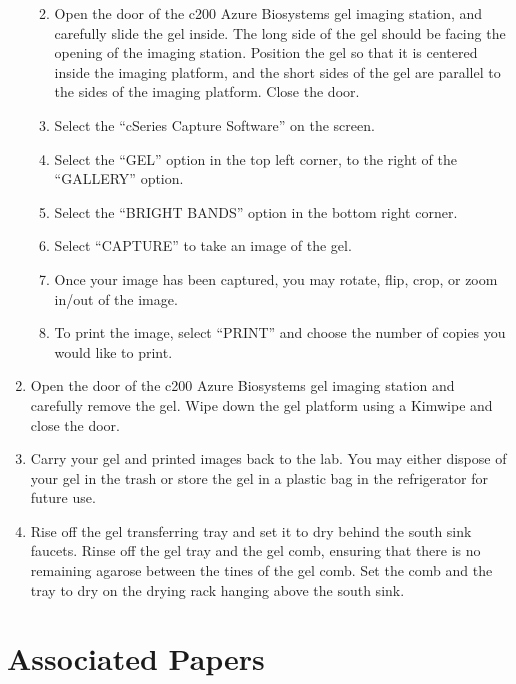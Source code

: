 \documentclass[
  letterpaper,
  DIV=11,
  numbers=noendperiod]{scrreprt}
\providecommand{\tightlist}{%
  \setlength{\itemsep}{0pt}\setlength{\parskip}{0pt}}\usepackage{longtable,booktabs,array}
\begin{document}
\begin{enumerate}
  \begin{enumerate}
  \def\labelenumii{\alph{enumii}.}
  \tightlist
  \item
    Open the door of the c200 Azure Biosystems gel imaging station, and
    carefully slide the gel inside. The long side of the gel should be
    facing the opening of the imaging station. Position the gel so that
    it is centered inside the imaging platform, and the short sides of
    the gel are parallel to the sides of the imaging platform. Close the
    door.
  \item
    Select the ``cSeries Capture Software'' on the screen.
  \item
    Select the ``GEL'' option in the top left corner, to the right of
    the ``GALLERY'' option.
  \item
    Select the ``BRIGHT BANDS'' option in the bottom right corner.
  \item
    Select ``CAPTURE'' to take an image of the gel.
  \item
    Once your image has been captured, you may rotate, flip, crop, or
    zoom in/out of the image.
  \item
    To print the image, select ``PRINT'' and choose the number of copies
    you would like to print.
  \end{enumerate}
\item
  Open the door of the c200 Azure Biosystems gel imaging station and
  carefully remove the gel. Wipe down the gel platform using a Kimwipe
  and close the door.
\item
  Carry your gel and printed images back to the lab. You may either
  dispose of your gel in the trash or store the gel in a plastic bag in
  the refrigerator for future use.
\item
  Rise off the gel transferring tray and set it to dry behind the south
  sink faucets. Rinse off the gel tray and the gel comb, ensuring that
  there is no remaining agarose between the tines of the gel comb. Set
  the comb and the tray to dry on the drying rack hanging above the
  south sink.
\end{enumerate}

\hypertarget{associated-papers}{%
\section{Associated Papers}\label{associated-papers}}
\end{document}
